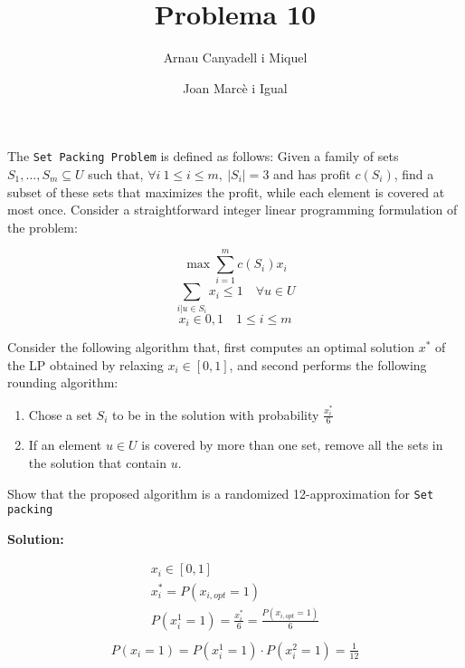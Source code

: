 \documentclass[a4paper]{article}
\title{Problema 10}
\author{Arnau Canyadell i Miquel \and Joan Marcè i Igual}
\date{}
\begin{document}
\maketitle

The \texttt{Set Packing Problem} is defined as follows: Given a family of sets $S_1,...,S_m \subseteq U$ such that, $\forall i \ 1 \le i \le m,\ |S_i|=3$ and has profit $c(S_i)$, find a subset of these sets that maximizes the profit, while each element is covered at most once. Consider a straightforward integer linear programming formulation of the problem:

$$
\max \sum_{i=1}^m c(S_i)x_i
$$
$$
\sum_{i|u\in S_i} x_i \le 1 \quad \forall u \in U
$$
$$
x_i \in {0, 1} \quad 1 \le i \le m
$$

Consider the following algorithm that, first computes an optimal solution $x^*$ of the LP obtained by relaxing $x_i \in [0, 1]$, and second performs the following rounding algorithm:
\begin{enumerate}
	\item Chose a set $S_i$ to be in the solution with probability $\frac{x_i^*}{6}$
	\item If an element $u\in U$ is covered by more than one set, remove all the sets in the solution that contain $u$.
\end{enumerate}

Show that the proposed algorithm is a randomized 12-approximation for \texttt{Set packing}

\textbf{Solution:}


\begin{gather*}
	x_i \in [0,1] \\
	x_i^* = P(x_{i,opt} = 1) \\
	P(x_i^1 = 1) = \frac{x_i^*}{6} = \frac{P(x_{i,opt} = 1)}{6} \\
\end{gather*}
\begin{gather*}
	P(x_i = 1) = P(x_i^1 = 1) \cdot P(x_i^2 = 1) = \frac{1}{12}
\end{gather*}
\end{document}

